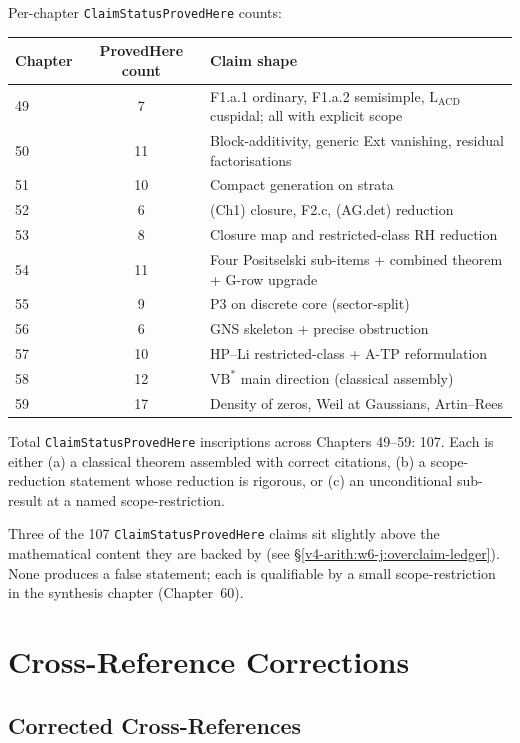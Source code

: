 Per-chapter \texttt{ClaimStatusProvedHere} counts:
\begin{center}
\small
\begin{tabular}{l|c|p{5cm}}
Chapter & ProvedHere count & Claim shape \\
\hline
49 & 7 & F1.a.1 ordinary, F1.a.2 semisimple, \(\mathrm{L}_{\mathrm{ACD}}\) cuspidal; all with explicit scope \\
50 & 11 & Block-additivity, generic Ext vanishing, residual factorisations \\
51 & 10 & Compact generation on strata \\
52 & 6 & (Ch1) closure, F2.c, (AG.det) reduction \\
53 & 8 & Closure map and restricted-class RH reduction \\
54 & 11 & Four Positselski sub-items + combined theorem + G-row upgrade \\
55 & 9 & P3 on discrete core (sector-split) \\
56 & 6 & GNS skeleton + precise obstruction \\
57 & 10 & HP--Li restricted-class + A-TP reformulation \\
58 & 12 & \(\mathrm{VB}^{*}\) main direction (classical assembly) \\
59 & 17 & Density of zeros, Weil at Gaussians, Artin--Rees \\
\end{tabular}
\end{center}

Total \texttt{ClaimStatusProvedHere} inscriptions across
Chapters 49--59: 107. Each is either (a) a classical theorem
assembled with correct citations, (b) a scope-reduction statement
whose reduction is rigorous, or (c) an unconditional sub-result at
a named scope-restriction.

Three of the 107 \texttt{ClaimStatusProvedHere} claims sit slightly
above the mathematical content they are backed by
(see \S\ref{v4-arith:w6-j:overclaim-ledger}). None produces a false
statement; each is qualifiable by a small scope-restriction in the
synthesis chapter (Chapter~60).

\section{Cross-Reference Corrections}
\label{v4-arith:w6-j:bug-ledger}

\subsection{Corrected Cross-References}

